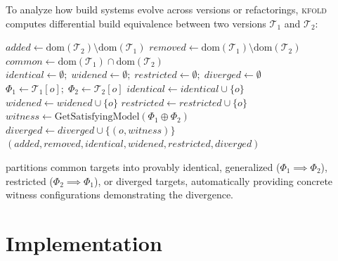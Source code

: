 \documentclass[acmsmall,screen,review]{acmart}
\newcommand{\tool}{\textsc{kfold}\xspace}
\begin{document}
To analyze how build systems evolve across versions or refactorings, \tool computes differential build equivalence between two versions $\mathcal{T}_1$ and $\mathcal{T}_2$:

\begin{algorithm}[t]
\caption{Differential Build Equivalence and Change Impact Analysis}
\label{alg:diff-analysis}
\begin{algorithmic}[1]
  \State $\mathit{added} \gets \mathrm{dom}(\mathcal{T}_2) \setminus \mathrm{dom}(\mathcal{T}_1)$
  \State $\mathit{removed} \gets \mathrm{dom}(\mathcal{T}_1) \setminus \mathrm{dom}(\mathcal{T}_2)$
  \State $\mathit{common} \gets \mathrm{dom}(\mathcal{T}_1) \cap \mathrm{dom}(\mathcal{T}_2)$
  \State $\mathit{identical} \gets \emptyset; \; \mathit{widened} \gets \emptyset; \; \mathit{restricted} \gets \emptyset; \; \mathit{diverged} \gets \emptyset$
    \State $\Phi_1 \gets \mathcal{T}_1[o]; \; \Phi_2 \gets \mathcal{T}_2[o]$
      \State $\mathit{identical} \gets \mathit{identical} \cup \{ o \}$
      \State $\mathit{widened} \gets \mathit{widened} \cup \{ o \}$
      \State $\mathit{restricted} \gets \mathit{restricted} \cup \{ o \}$
    \Else
      \State $\mathit{witness} \gets \mathrm{GetSatisfyingModel}(\Phi_1 \oplus \Phi_2)$
      \State $\mathit{diverged} \gets \mathit{diverged} \cup \{ (o, \mathit{witness}) \}$
    \EndIf
  \EndFor
  \State \Return $(\mathit{added}, \mathit{removed}, \mathit{identical}, \mathit{widened}, \mathit{restricted}, \mathit{diverged})$
\EndFunction
\end{algorithmic}
\end{algorithm}

 partitions common targets into provably identical, generalized ($\Phi_1 \implies \Phi_2$), restricted ($\Phi_2 \implies \Phi_1$), or diverged targets, automatically providing concrete witness configurations demonstrating the divergence.

\section{Implementation}
\label{sec:impl}
\end{document}
